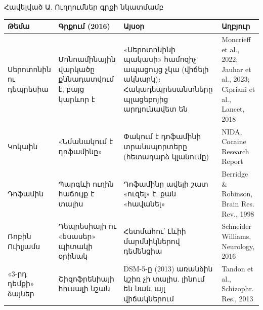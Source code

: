 \appendix
{}\gdef{}\gdef{}

\begin{frame}{Հավելված Ա. Ուղղումներ գրքի նկատմամբ}
  \scriptsize
  \setlength{\tabcolsep}{4pt}
  \renewcommand{\arraystretch}{1.25}
  \begin{tabular}{@{}L{2.1cm}L{3.0cm}L{4.8cm}L{3.6cm}@{}}
    \toprule
    \textbf{Թեմա} & \textbf{Գրքում (2016)} & \textbf{Այսօր} & \textbf{Աղբյուր}\\
    \midrule
    Սերոտոնին ու դեպրեսիա & Մոնոամինային վարկածը քննադատվում է, բայց կարևոր է & «Սերոտոնինի պակասի» համոզիչ ապացույց չկա (վիճելի ակնարկ)։ Հակադեպրեսանտները պլացեբոյից արդյունավետ են & Moncrieff et al., 2022; Jauhar et al., 2023; Cipriani et al., Lancet, 2018\\
    Կոկաին & «Նմանակում է դոֆամինը» & Փակում է դոֆամինի տրանսպորտերը (հետադարձ կլանումը) & NIDA, Cocaine Research Report\\
    Դոֆամին & Պարգևի ուղին հաճույք է տալիս & Դոֆամինը ավելի շատ «ուզել» է, քան «հավանել» & Berridge \& Robinson, Brain Res. Rev., 1998\\
    Ռոբին Ուիլյամս & Դեպրեսիայի ու «եսասեր» պիտակի օրինակ & Հետմահու՝ Լևիի մարմնիկներով դեմենցիա & Schneider Williams, Neurology, 2016\\
    «3-րդ դեմքի» ձայներ & Շիզոֆրենիայի հուսալի նշան & DSM-5-ը (2013) առանձին կշիռ չի տալիս. լինում են նաև այլ վիճակներում & Tandon et al., Schizophr. Res., 2013\\
    \bottomrule
  \end{tabular}
\end{frame}

